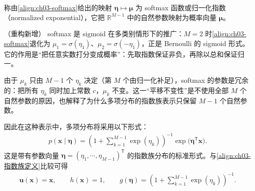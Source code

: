 \documentclass[../../main.tex]{subfiles}
\begin{document}
\begin{definition}[softmax 函数]\label{definition:ch03-softmax}
称由\eqref{align:ch03-softmax}给出的映射 $\boldsymbol{\eta}\mapsto\boldsymbol{\mu}$ 为 softmax 函数或归一化指数（normalized exponential），它把 $\mathbb{R}^{M-1}$ 中的自然参数映射为概率向量 $\boldsymbol{\mu}$。
\end{definition}

\begin{remark}（重构新增）
softmax 是 sigmoid 在多类别情形下的推广：$M=2$ 时\eqref{align:ch03-softmax}退化为 $\mu_1=\sigma(\eta_1)$、$\mu_2=\sigma(-\eta_1)$，正是 Bernoulli 的 sigmoid 形式。它的作用是“把任意实数打分变成概率”：先取指数保证非负，再除以总和保证归一。

由于 $\mu_k$ 只由 $M-1$ 个 $\eta_k$ 决定（第 $M$ 个由归一化补足），softmax 的参数是冗余的：把所有 $\eta_k$ 同时加上常数 $c$，$\mu_k$ 不变。这一“平移不变性”是不使用全部 $M$ 个自然参数的原因，也解释了为什么多项分布的指数族表示只保留 $M-1$ 个自然参数。
\end{remark}

因此在这种表示中，多项分布将采用以下形式：
\begin{align}
p(\boldsymbol{x}\mid\boldsymbol{\eta})=\left(1+\sum_{k=1}^{M-1}\exp(\eta_k)\right)^{-1}\exp\bigl(\boldsymbol{\eta}^{\mathsf{T}}\boldsymbol{x}\bigr).
\label{align:ch03-多项标准形式}
\end{align}
这是带有参数向量 $\boldsymbol{\eta}=(\eta_1,\cdots,\eta_{M-1})^{\mathsf{T}}$ 的指数族分布的标准形式。与\eqref{align:ch03-指数族定义}比较可得
\begin{align}
\boldsymbol{u}(\boldsymbol{x})=\boldsymbol{x},\qquad h(\boldsymbol{x})=1,\qquad g(\boldsymbol{\eta})=\left(1+\sum_{k=1}^{M-1}\exp(\eta_k)\right)^{-1}.
\label{align:ch03-多项标准参数}
\end{align}
\end{document}
